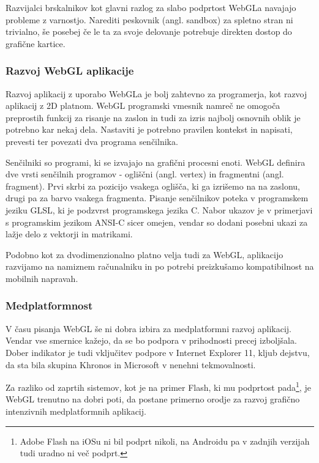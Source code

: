 Razvijalci brskalnikov kot glavni razlog za slabo podprtost WebGLa navajajo probleme z varnostjo. Narediti peskovnik (angl. sandbox) za spletno stran ni trivialno, še posebej če le ta za svoje delovanje potrebuje direkten dostop do grafične kartice.

\subsubsection{Razvoj WebGL aplikacije}

Razvoj aplikacij z uporabo WebGLa je bolj zahtevno za programerja, kot razvoj aplikacij z 2D platnom. WebGL programski vmesnik namreč ne omogoča preprostih funkcij za risanje na zaslon in tudi za izris najbolj osnovnih oblik je potrebno kar nekaj dela. Nastaviti je potrebno pravilen kontekst in napisati, prevesti ter povezati dva programa senčilnika. 

Senčilniki so programi, ki se izvajajo na grafični procesni enoti. WebGL definira dve vrsti senčilnih programov - ogliščni (angl. vertex) in fragmentni (angl. fragment). Prvi skrbi za pozicijo vsakega oglišča, ki ga izrišemo na na zaslonu, drugi pa za barvo vsakega fragmenta. Pisanje senčilnikov poteka v programskem jeziku GLSL, ki je podzvrst programskega jezika C. Nabor ukazov je v primerjavi s programskim jezikom ANSI-C sicer omejen, vendar so dodani posebni ukazi za lažje delo z vektorji in matrikami.

Podobno kot za dvodimenzionalno platno velja tudi za WebGL, aplikacijo razvijamo na namiznem računalniku in po potrebi preizkušamo kompatibilnost na mobilnih napravah.

\subsubsection{Medplatformnost}

V času pisanja WebGL še ni dobra izbira za medplatformni razvoj aplikacij. Vendar vse smernice kažejo, da se bo podpora v prihodnosti precej izboljšala. Dober indikator je tudi vključitev podpore v Internet Explorer 11, kljub dejstvu, da sta bila skupina Khronos in Microsoft v nenehni tekmovalnosti.

Za razliko od zaprtih sistemov, kot je na primer Flash, ki mu podprtost pada\footnote{Adobe Flash na iOSu ni bil podprt nikoli, na Androidu pa v zadnjih verzijah tudi uradno ni več podprt.}, je WebGL trenutno na dobri poti, da postane primerno orodje za razvoj grafično intenzivnih medplatformnih aplikacij.

